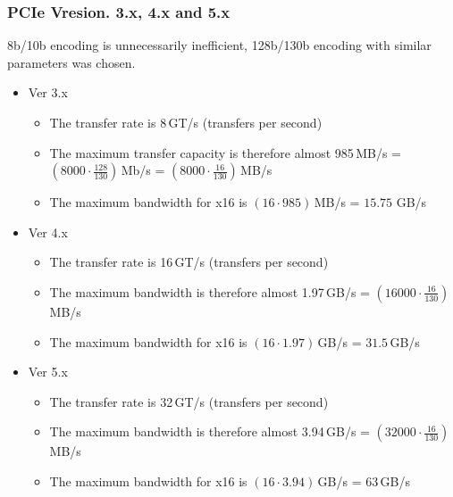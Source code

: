 \documentclass{beamer}
\begin{document}
\begin{frame}
\frametitle{PCIe Vresion. 3.x, 4.x and 5.x}

8b/10b encoding is unnecessarily inefficient, 128b/130b encoding with similar parameters was chosen.
\begin{itemize}
\item Ver 3.x
\begin{itemize}
\item The transfer rate is 8\,GT/s (transfers per second)
\item The maximum transfer capacity is therefore almost 985\,MB/s = $(8000 \cdot \frac{128}{130})$\,Mb/s = $(8000 \cdot \frac{16}{130})$\,MB/s
\item The maximum bandwidth for x16 is $(16 \cdot 985)$\,MB/s = $15.75$ GB/s
\end{itemize}
\item Ver 4.x
\begin{itemize}
\item The transfer rate is 16\,GT/s (transfers per second)
\item The maximum bandwidth is therefore almost 1.97\,GB/s = $(16000 \cdot \frac{16}{130})$ MB/s
\item The maximum bandwidth for x16 is $(16 \cdot 1.97)$\,GB/s = $31.5$\,GB/s
\end{itemize}
\item Ver 5.x
\begin{itemize}
\item The transfer rate is 32\,GT/s (transfers per second)
\item The maximum bandwidth is therefore almost 3.94\,GB/s = $(32000 \cdot \frac{16}{130})$\,MB/s
\item The maximum bandwidth for x16 is $(16 \cdot 3.94)$\,GB/s = $63$\,GB/s
\end{itemize}
\end{itemize}

\end{frame}
\end{document}
